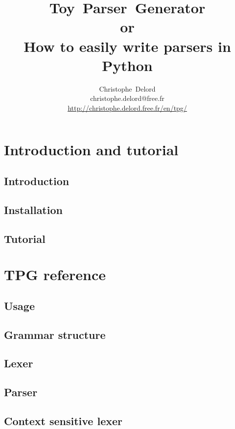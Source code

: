 \documentclass[a4paper,twoside]{report}
\author{
    Christophe~Delord\\
    christophe.delord@free.fr \\
    \url{http://christophe.delord.free.fr/en/tpg/} \\
}
\title{
    Toy~Parser~Generator \\
    or\\
    How to easily write parsers in Python \\
}
\begin{document}
\maketitle
\tableofcontents

\listoffigures

\cleardoublepage
\part{Introduction and tutorial}                            \label{tpg:intro}
    \chapter{Introduction}
        
    \chapter{Installation}
        
    \chapter{Tutorial}                                      \label{tpg:tutorial}
        

\cleardoublepage
\part{TPG reference}                                        \label{tpg:core}
    \chapter{Usage}
        
    \chapter{Grammar structure}
        
    \chapter{Lexer}
        
    \chapter{Parser}
        
    \chapter{Context sensitive lexer}                       \label{tpg:CSL}
        
\end{document}
